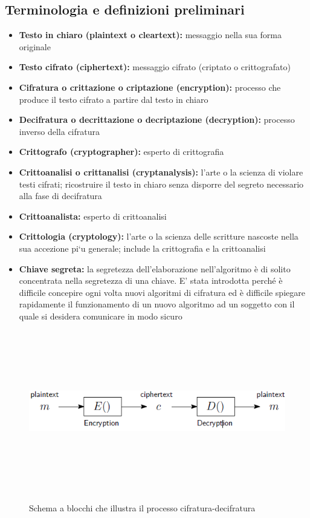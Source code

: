 \subsection{Terminologia e definizioni preliminari}
\begin{itemize} 
  \item \textbf{Testo in chiaro (plaintext o cleartext):} messaggio nella sua forma originale
  \item \textbf{Testo cifrato (ciphertext):} messaggio cifrato (criptato o crittografato)
  \item \textbf{Cifratura o crittazione o criptazione (encryption):} processo che produce il testo cifrato a partire dal testo in chiaro
  \item \textbf{Decifratura o decrittazione o decriptazione (decryption):} processo inverso della cifratura
  \item \textbf{Crittografo (cryptographer):} esperto di crittografia
  \item \textbf{Crittoanalisi o crittanalisi (cryptanalysis):} l’arte o la scienza di violare testi cifrati; ricostruire il testo in chiaro senza disporre del segreto necessario alla fase di decifratura
  \item \textbf{Crittoanalista:} esperto di crittoanalisi
  \item \textbf{Crittologia (cryptology):} l’arte o la scienza delle scritture nascoste nella sua accezione pi`u generale; include la crittografia e la crittoanalisi
  \item \textbf{Chiave segreta:} la segretezza dell'elaborazione nell'algoritmo è di solito concentrata nella segretezza di una chiave. E' stata introdotta perché è difficile concepire ogni volta nuovi algoritmi di cifratura ed è difficile spiegare rapidamente il funzionamento di un nuovo    algoritmo ad un soggetto con il quale si desidera comunicare in modo sicuro
\end{itemize}
\begin{figure}[htbp]
	\centering%
	\subfigure%
	{\includegraphics[height=7cm, width=12cm, keepaspectratio]{Immagini/Capitolo1/schema_blocchi_crittografia.png}}
	\caption{Schema a blocchi che illustra il processo cifratura-decifratura \label{fig:schema_blocchi_crittografia}} 	
\end{figure}

